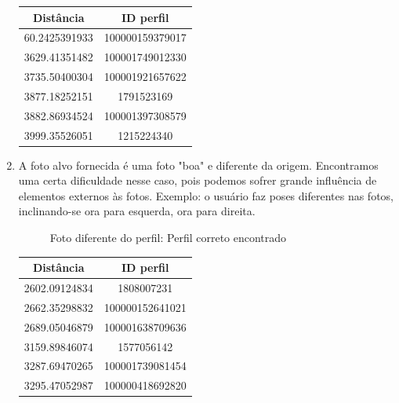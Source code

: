 \documentclass[10pt,a4paper]{article}
\begin{document}
\begin{enumerate}
\begin{table}[h!]
\begin{center}
\begin{tabular}{cc}
Distância & ID perfil \\
\hline
60.2425391933 & 100000159379017\\
3629.41351482 & 100001749012330\\
3735.50400304 & 100001921657622\\
3877.18252151 & 1791523169\\
3882.86934524 & 100001397308579\\
3999.35526051 & 1215224340
\end{tabular}
\end{center}
\end{table}



	\item A foto alvo fornecida é uma foto "boa" e diferente da origem. Encontramos uma certa dificuldade nesse caso, pois podemos sofrer grande influência de elementos externos às fotos. Exemplo: o usuário faz poses diferentes nas fotos, inclinando-se ora para esquerda, ora para direita.


\begin{flushleft}
\begin{figure}[h!]
\begin{flushleft}
  
\caption{Foto diferente do perfil: Perfil correto encontrado}
\par\end{flushleft}
\end{figure}
\par\end{flushleft}

\vspace{-0.5cm}
\begin{table}[h!]
\begin{center}
\begin{tabular}{cc}
Distância & ID perfil \\
\hline
2602.09124834 & 1808007231\\
2662.35298832 & 100000152641021\\
2689.05046879 & 100001638709636\\
3159.89846074 & 1577056142\\
3287.69470265 & 100001739081454\\
3295.47052987 & 100000418692820
\end{tabular}
\end{center}
\end{table}



\end{enumerate}
\end{document}
